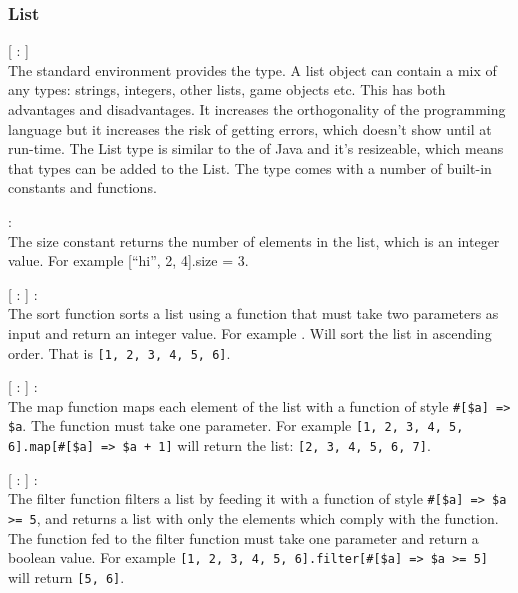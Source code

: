 \subsubsection{List}

\begin{dlist}
  \item {}[ : ]\\
    The standard environment provides the  type. A list object can contain a mix of any types: strings, integers, other lists, game objects etc.
  This has both advantages and disadvantages. It increases the orthogonality of the programming language but it increases the risk of getting
  errors, which doesn't show until at run-time. The List type is similar to the  of Java and it's resizeable, which means that types can be added to the List. The type comes with a number of built-in constants and functions. 
  \item {} : \\
  The size constant returns the number of elements in the list, which is an integer value. For example [``hi'', 2, 4].size = 3.
  \item {}[ : ] :  \\
    The sort function sorts a list using a function that must take two parameters as input and return an integer value. For example . Will sort the list in ascending order. That is \texttt{[1, 2, 3, 4, 5, 6]}.
  \item {}[ : ] :  \\
    The map function maps each element of the list with a function of style \texttt{\#[\$a] => \$a}. The function must take one parameter. For example \texttt{[1, 2, 3, 4, 5, 6].map[\#[\$a] => \$a + 1]} will return the list: \texttt{[2, 3, 4, 5, 6, 7]}.
  \item {}[ : ] :  \\
    The filter function filters a list by feeding it with a function of style \texttt{\#[\$a] => \$a >= 5}, and returns a list with only the elements which comply with the function. The function fed to the filter function must take one parameter and return a boolean value. For example \texttt{[1, 2, 3, 4, 5, 6].filter[\#[\$a] => \$a >= 5]} will return \texttt{[5, 6]}. 
\end{dlist}

